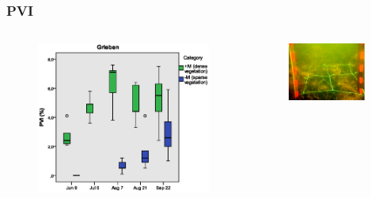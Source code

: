\documentclass[xcolor=dvipsnames]{beamer}
\begin{document}
\begin{frame}
\frametitle{PVI}
\begin{columns}
\begin{column}{7.0cm}
\begin{figure}
\includegraphics[width=\textwidth]{images/pvi/boxplot_pvi2.eps}
\hspace*{-9mm}
\end{figure}
\end{column}
\begin{column}{5.8cm}
\begin{figure}
\includegraphics[width=0.9\textwidth]{images/plotpictures/Bsp_G+M}
\hspace*{+9mm}
\end{figure}
\end{column}
\end{columns}
\end{frame}
\end{document}
